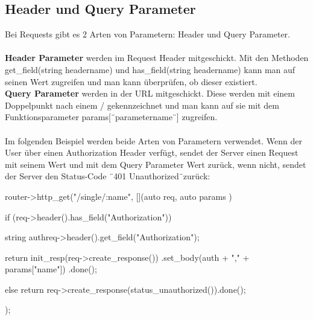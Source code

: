 \documentclass[german,oneside,color]{htldipl}
\begin{document}
\subsection{Header und Query Parameter}
Bei Requests gibt es 2 Arten von Parametern: Header und Query Parameter. 
\\ \\
\textbf{Header Parameter} werden im Request Header mitgeschickt. Mit den Methoden get\_field(string headername) und has\_field(string headername) kann man auf seinen Wert zugreifen und man kann überprüfen, ob dieser existiert.
\\
\textbf{Query Parameter} werden in der URL mitgeschickt. Diese werden mit einem Doppelpunkt nach einem / gekennzeichnet und man kann auf sie mit dem Funktionsparameter params[\"\ parametername\"\ ] zugreifen.
\\ \\
Im folgenden Beispiel werden beide Arten von Parametern verwendet. Wenn der User über einen Authorization Header verfügt, sendet der Server einen Request mit seinem Wert und mit dem Query Parameter Wert zurück, wenn nicht, sendet der Server den Status-Code \"\ 401 Unauthorized\"\ zurück:
\begin{program}[H]
\begin{JavaCode}
router->http_get("/single/:name", [](auto req, auto params ){
    if (req->header().has_field("Authorization")) {
        string auth{req->header().get_field("Authorization")};    
    
        return init_resp(req->create_response())
               .set_body(auth + "," + params["name"])
               .done();
    } else {
         return req->create_response(status_unauthorized()).done();
    }
});
\end{JavaCode}
\end{program}
\end{document}
